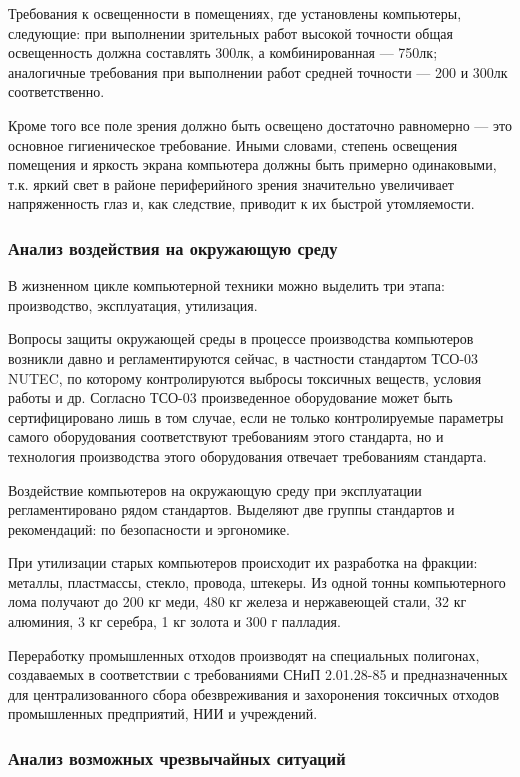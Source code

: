 Требования к освещенности в помещениях, где установлены компьютеры, следующие: при выполнении зрительных работ высокой точности общая освещенность должна составлять 300лк, а комбинированная --- 750лк; аналогичные требования при выполнении работ средней точности --- 200 и 300лк соответственно.

Кроме того все поле зрения должно быть освещено достаточно равномерно --- это основное гигиеническое требование. Иными словами, степень освещения помещения и яркость экрана компьютера должны быть примерно одинаковыми, т.к. яркий свет в районе периферийного зрения значительно увеличивает напряженность глаз и, как следствие, приводит к их быстрой утомляемости.

\subsubsection{Анализ воздействия на окружающую среду}

В жизненном цикле компьютерной техники можно выделить три этапа: производство, эксплуатация, утилизация.

Вопросы защиты окружающей среды в процессе производства компьютеров возникли давно и регламентируются сейчас, в частности стандартом ТСО-03 NUTEC, по которому контролируются выбросы токсичных веществ, условия работы и др.
Согласно ТСО-03 произведенное оборудование может быть сертифицировано лишь в том случае, если не только контролируемые параметры самого оборудования соответствуют требованиям этого стандарта, но и технология производства этого оборудования отвечает требованиям стандарта.

Воздействие компьютеров на окружающую среду при эксплуатации регламентировано рядом стандартов.
Выделяют две группы стандартов и рекомендаций: по безопасности и эргономике.

При утилизации старых компьютеров происходит их разработка на фракции: металлы, пластмассы, стекло, провода, штекеры.
Из одной тонны компьютерного лома получают до 200 кг меди, 480 кг железа и нержавеющей стали, 32 кг алюминия, 3 кг серебра, 1 кг золота и 300 г палладия.

Переработку промышленных отходов производят на специальных полигонах, создаваемых в соответствии с требованиями СНиП 2.01.28-85 и предназначенных для централизованного сбора обезвреживания и захоронения токсичных отходов промышленных предприятий, НИИ и учреждений.

\subsubsection{Анализ возможных чрезвычайных ситуаций}

